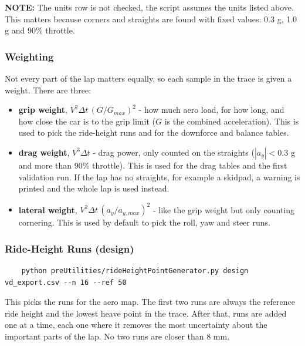 \textbf{NOTE:} The units row is not checked, the script assumes the units listed above. This matters because corners and straights are found with fixed values: 0.3 g, 1.0 g and 90\% throttle.

\subsubsection{Weighting}
Not every part of the lap matters equally, so each sample in the trace is given a weight. There are three:
\begin{itemize}
    \item \textbf{grip weight}, $V^2 \Delta t \, (G/G_{max})^2$ - how much aero load, for how long, and how close the car is to the grip limit ($G$ is the combined acceleration). This is used to pick the ride-height runs and for the downforce and balance tables.

    \item \textbf{drag weight}, $V^3 \Delta t$ - drag power, only counted on the straights ($|a_y| < 0.3$ g and more than 90\% throttle). This is used for the drag tables and the first validation run. If the lap has no straights, for example a skidpad, a warning is printed and the whole lap is used instead.

    \item \textbf{lateral weight}, $V^2 \Delta t \, (a_y/a_{y,max})^2$ - like the grip weight but only counting cornering. This is used by default to pick the roll, yaw and steer runs.
\end{itemize}

\subsubsection{Ride-Height Runs (design)}
\begin{lstlisting}
    python preUtilities/rideHeightPointGenerator.py design vd_export.csv --n 16 --ref 50
\end{lstlisting}
This picks the runs for the aero map. The first two runs are always the reference ride height and the lowest heave point in the trace. After that, runs are added one at a time, each one where it removes the most uncertainty about the important parts of the lap. No two runs are closer than 8 mm.

